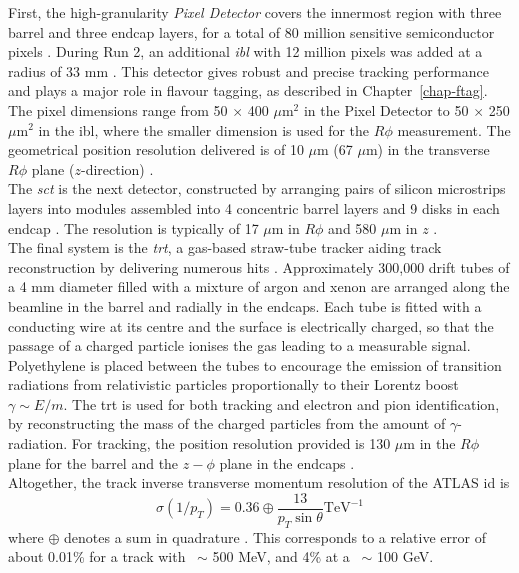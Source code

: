 First, the high-granularity \textit{Pixel Detector} covers the innermost region with three barrel and three endcap layers, for a total of 80 million sensitive semiconductor pixels \cite{CERN-LHCC-97-016, Potamianos:2015lar}. During Run 2, an additional \textit{\gls{ibl}} with 12 million pixels was added at a radius of 33 mm \cite{Capeans:1291633}. This detector gives robust and precise tracking performance and plays a major role in flavour tagging, as described in Chapter~\ref{chap-ftag}. The pixel dimensions range from 50 $\times$ 400 $\mu$m$^2$ in the Pixel Detector to 50 $\times$ 250 $\mu$m$^2$ in the \gls{ibl}, where the smaller dimension is used for the $R\phi$ measurement. The geometrical position resolution delivered is of 10 $\mu$m (67 $\mu$m) in the transverse $R\phi$ plane ($z$-direction) \cite{Pernegger_2015, ATL-INDET-PUB-2016-001}. \\

The \textit{\gls{sct}} is the next detector, constructed by arranging pairs of silicon microstrips layers into modules assembled into 4 concentric barrel layers and 9 disks in each endcap \cite{AHMAD200798, CERN-LHCC-2017-005}. The resolution is typically of 17 $\mu$m in $R\phi$ and 580 $\mu$m in $z$ \cite{ATLASSCT}. \\

The final system is the \textit{\gls{trt}}, a gas-based straw-tube tracker aiding track reconstruction by delivering numerous hits \cite{TheATLASTRTcollaboration_2008}. Approximately 300,000 drift tubes of a 4 mm diameter filled with a mixture of argon and xenon are arranged along the beamline in the barrel and radially in the endcaps. Each tube is fitted with a conducting wire at its centre and the surface is electrically charged, so that the passage of a charged particle ionises the gas leading to a measurable signal. Polyethylene is placed between the tubes to encourage the emission of transition radiations from relativistic particles proportionally to their Lorentz boost $\gamma \sim E / m$. The \gls{trt} is used for both tracking and electron and pion identification, by reconstructing the mass of the charged particles from the amount of $\gamma$-radiation. For tracking, the position resolution provided is 130 $\mu$m in the $R\phi$ plane for the barrel and the $z-\phi$ plane in the endcaps \cite{Vogel:1537991}. \\

Altogether, the track inverse transverse momentum resolution of the ATLAS \gls{id} is
\begin{equation}
  \sigma(1 / p_T) = 0.36 \oplus \frac{13}{p_T \sin\theta} \text{TeV}^{-1}
\end{equation}
where $\oplus$ denotes a sum in quadrature \cite{TheATLASCollaboration_2008}. This corresponds to a relative error of about 0.01\% for a track with \pt\ $\sim$ 500 MeV, and 4\% at a \pt\ $\sim$ 100 GeV.

